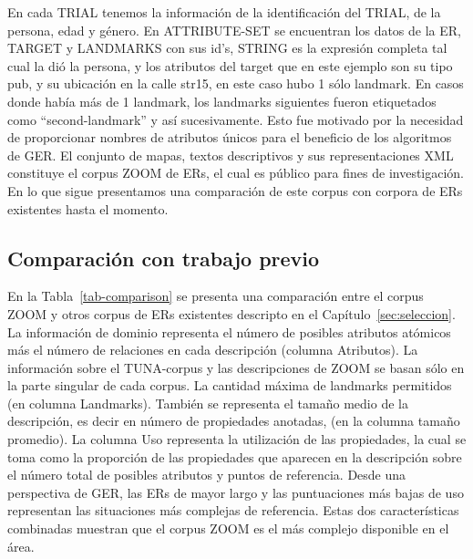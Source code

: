 

En cada TRIAL tenemos la informaci\'on de la identificaci\'on del TRIAL, de la persona, edad y g\'enero. En ATTRIBUTE-SET se encuentran los datos de la ER, TARGET y LANDMARKS con sus id's, STRING es la expresi\'on completa tal cual la di\'o la persona, y los atributos del target que en este ejemplo son su tipo pub, y su ubicaci\'on en la calle str15, en este caso hubo 1 s\'olo landmark. En casos donde hab\'ia m\'as de 1 landmark, los landmarks siguientes fueron etiquetados como ``second-landmark'' y as\'{i} sucesivamente. Esto fue motivado por la necesidad de proporcionar nombres de atributos \'unicos para el beneficio de los algoritmos de GER.
El conjunto de mapas, textos descriptivos y sus representaciones XML constituye el corpus ZOOM de ERs, el cual es p\'ublico para fines de investigaci\'on.  En lo que sigue presentamos una comparaci\'on de este corpus con corpora de ERs existentes hasta el momento. 

\subsection{Comparaci\'on con trabajo previo}
\label{sec:comparacion_trabajo_previo}

En la Tabla~\ref{tab-comparison} se presenta una comparaci\'on entre el corpus ZOOM y otros corpus de ERs existentes descripto en el Cap\'itulo~\ref{sec:seleccion}. La informaci\'on de dominio representa el n\'umero de posibles atributos at\'omicos m\'as el n\'umero de relaciones en cada descripci\'on (columna Atributos). La informaci\'on sobre el TUNA-corpus y las descripciones de ZOOM se basan s\'olo en la parte singular de cada corpus. La cantidad m\'axima de landmarks permitidos (en columna Landmarks). Tambi\'en se representa el tama\~no medio de la descripci\'on, es decir en n\'umero de propiedades anotadas, (en la columna tama\~no promedio). La columna Uso representa la utilizaci\'on de las propiedades, la cual se toma como la proporci\'on de las propiedades que aparecen en la descripci\'on sobre el n\'umero total de posibles atributos y puntos de referencia. Desde una perspectiva de GER, las ERs de mayor largo y las puntuaciones m\'as bajas de uso representan las situaciones m\'as complejas de referencia. Estas dos caracter\'isticas combinadas muestran que el corpus ZOOM es el m\'as complejo disponible en el \'area.


